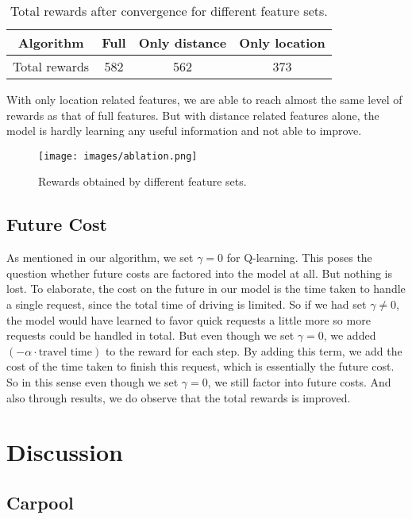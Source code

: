 \documentclass{article}
\begin{document}
\begin{table}[!htb]
\caption{Total rewards after convergence for different feature sets.}
\label{tbl:ablation}
\centering
\begin{tabular}{c|ccc}
\hline
Algorithm & Full & Only distance & Only location \\\hline
Total rewards & 582 & 562 & 373
\end{tabular}
\end{table}

With only location related features, we are able to reach almost the same level of rewards as that of full features. But with distance related features alone, the model is hardly learning any useful information and not able to improve.

\begin{figure}[!htb]
\begin{center}
\texttt{[image: images/ablation.png]}
\end{center}
\caption{Rewards obtained by different feature sets.}
\label{fig:ablation}
\end{figure}

\subsection{Future Cost}

As mentioned in our algorithm, we set $\gamma=0$ for Q-learning. This poses the question whether future costs are factored into the model at all. But nothing is lost. To elaborate, the cost on the future in our model is the time taken to handle a single request, since the total time of driving is limited. So if we had set $\gamma\neq 0$, the model would have learned to favor quick requests a little more so more requests could be handled in total. But even though we set $\gamma=0$, we added $(-\alpha\cdot\text{travel time})$ to the reward for each step. By adding this term, we add the cost of the time taken to finish this request, which is essentially the future cost. So in this sense even though we set $\gamma=0$, we still factor into future costs. And also through results, we do observe that the total rewards is improved.

\section{Discussion}

\subsection{Carpool}
\end{document}
